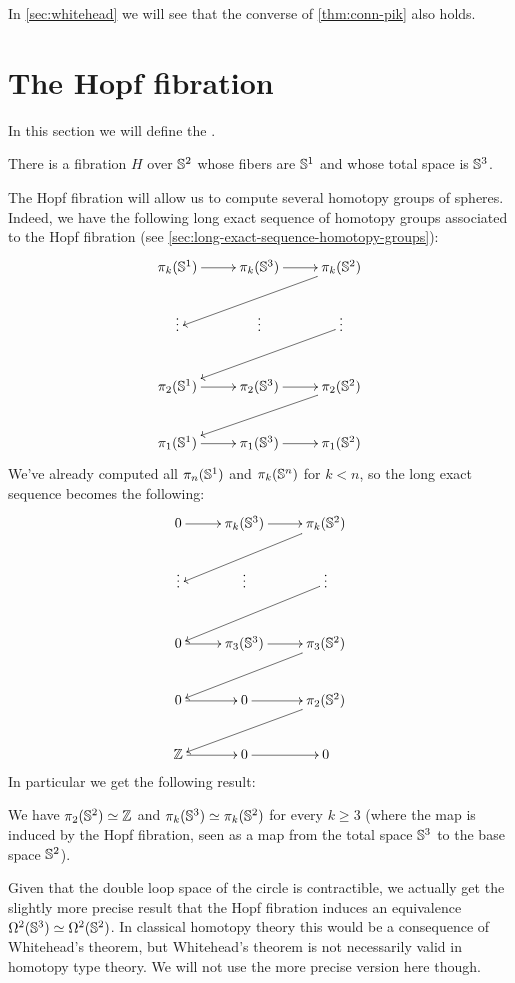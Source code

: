 In \autoref{sec:whitehead} we will see that the converse of \autoref{thm:conn-pik} also holds.


\section{The Hopf fibration}
\label{sec:hopf}

In this section we will define the .
%

\begin{thm}
There is a fibration $H$ over $\mathbb{S} ^2$ whose fibers are $\mathbb{S} ^1$ and
whose total space is $\mathbb{S} ^3$.
\end{thm}

The Hopf fibration will allow us to compute several homotopy groups of
spheres. Indeed, we have the following long exact sequence
%
of homotopy groups
associated to the Hopf fibration (see
\autoref{sec:long-exact-sequence-homotopy-groups}):
%
\[
\xymatrix{
  \pi_k(\Sn^1) \ar[r] & \pi_k(\Sn^3) \ar[r] & \pi_k(\Sn^2) \ar[lld] \\
  \vdots & \vdots & \vdots \ar[lld] \\
  \pi_2(\Sn^1) \ar[r] & \pi_2(\Sn^3) \ar[r] & \pi_2(\Sn^2) \ar[lld] \\
  \pi_1(\Sn^1) \ar[r] & \pi_1(\Sn^3) \ar[r] & \pi_1(\Sn^2)}
\]
%
We’ve already computed all $\pi_n(\mathbb{S}^1)$ and $\pi_k(\mathbb{S}^n)$ for $k<n$, so the
long exact sequence becomes the following:
%
\[
\xymatrix{
  0 \ar[r] & \pi_k(\Sn^3) \ar[r] & \pi_k(\Sn^2) \ar[lld] \\
  \vdots & \vdots & \vdots \ar[lld] \\
  0 \ar[r] & \pi_3(\Sn^3) \ar[r] & \pi_3(\Sn^2) \ar[lld] \\
  0 \ar[r] & 0 \ar[r] & \pi_2(\Sn^2) \ar[lld] \\
  \Z \ar[r] & 0 \ar[r] & 0}
\]
%
In particular we get the following result:

\begin{cor} \label{cor:pis2-hopf}
  We have $\pi_2(\mathbb{S}^2) \simeq \mathbb{Z}$ and $\pi_k(\mathbb{S}^3) \simeq \pi_k(\mathbb{S}^2)$ for
  every $k\ge3$ (where the map is induced by the Hopf fibration, seen as a map
  from the total space $\mathbb{S}^3$ to the base space $\mathbb{S}^2$).
\end{cor}

Given that the double loop space of the circle is contractible, we actually get
the slightly more precise result that the Hopf fibration induces an equivalence
$\Omega^2(\mathbb{S}^3) \simeq \Omega^2(\mathbb{S}^2)$. In classical homotopy theory this
would be a consequence of Whitehead's theorem, but Whitehead's theorem is not
necessarily valid in homotopy type theory. We will not use the more precise
version here though.

